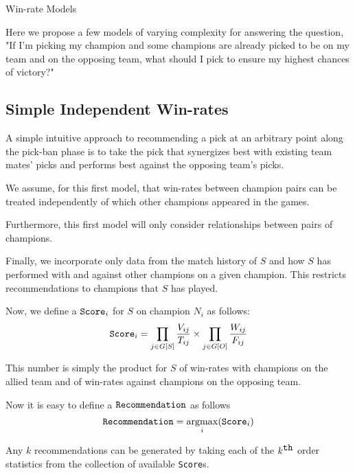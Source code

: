 \documentclass[12pt,letterpaper]{article}
\DeclareMathOperator*{\argmax}{argmax}
\begin{document}
\begin{section}{Win-rate Models}

Here we propose a few models of varying complexity for answering the question,
"If I'm picking my champion and some champions are already picked to be on my
team and on the opposing team, what should I pick to ensure my highest chances
of victory?"

\subsection{Simple Independent Win-rates}

A simple intuitive approach to recommending a pick at an arbitrary point along
the pick-ban phase is to take the pick that synergizes best with existing team
mates' picks and performs best against the opposing team's picks.
\hfill \vspace{2mm}

We assume, for this first model, that win-rates between champion pairs can be
treated independently of which other champions appeared in the games.
\hfill \vspace{2mm}

Furthermore, this first model will only consider relationships between pairs of
champions.
\hfill \vspace{2mm}

Finally, we incorporate only data from the match history of $S$ and how $S$ has
performed with and against other champions on a given champion. This restricts
recommendations to champions that $S$ has played.
\hfill \vspace{2mm}

Now, we define a $\verb|Score|_i$ for $S$ on champion $N_i$ as follows:
\begin{equation}
    \verb|Score|_i =
    \prod_{j \in {G[S]}} { \frac { V_{ij} } { T_{ij} } } \times
    \prod_{j \in {G[O]}} { \frac { W_{ij} } { F_{ij} } }
\end{equation}

This number is simply the product for $S$ of win-rates with champions on the
allied team and of win-rates against champions on the opposing team.

Now it is easy to define a $\verb|Recommendation|$ as follows
\begin{equation}
    \verb|Recommendation| = 
    \argmax_i({\verb|Score|_i})
\end{equation}

Any $k$ recommendations can be generated by taking each of the $k^{\verb|th|}$
order statistics from the collection of available \verb|Score|s.


\end{section}
\end{document}
